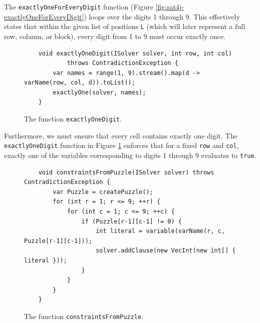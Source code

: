 \noindent
The \texttt{exactlyOneForEveryDigit} function (Figure \ref{fig:sat4j-exactlyOneForEveryDigit}) loops over
the digits 1 through 9. This effectively states that within the given list of positions \texttt{L} (which will
later represent a full row, column, or block), every digit from 1 to 9 must occur exactly once. 

\begin{figure}[!ht]
  \centering
\begin{verbatim}
    void exactlyOneDigit(ISolver solver, int row, int col)
            throws ContradictionException {
        var names = range(1, 9).stream().map(d -> varName(row, col, d)).toList();
        exactlyOne(solver, names);
    }
\end{verbatim}
\vspace*{-0.3cm}
  \caption{The function \texttt{exactlyOneDigit}.}
  \label{fig:sat4j-exactlyOneDigit}
\end{figure}

\noindent
Furthermore, we must ensure that every cell contains exactly one digit.  The \texttt{exactlyOneDigit}
function in Figure \ref{fig:sat4j-exactlyOneDigit} enforces that for a fixed \texttt{row} and
\texttt{col}, exactly one of the variables corresponding to digits 1 through 9 evaluates to \texttt{true}. 

\begin{figure}[!ht]
  \centering
\begin{verbatim}
    void constraintsFromPuzzle(ISolver solver) throws ContradictionException {
        var Puzzle = createPuzzle();
        for (int r = 1; r <= 9; ++r) {
            for (int c = 1; c <= 9; ++c) {
                if (Puzzle[r-1][c-1] != 0) {
                    int literal = variable(varName(r, c, Puzzle[r-1][c-1]));
                    solver.addClause(new VecInt(new int[] { literal }));
                }
            }
        }
    }
\end{verbatim}
\vspace*{-0.3cm}
  \caption{The function \texttt{constraintsFromPuzzle}.}
  \label{fig:sat4j-constraintsFromPuzzle}
\end{figure}


